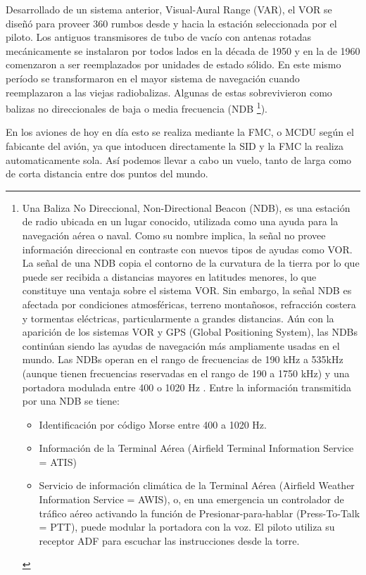 Desarrollado de un sistema anterior, Visual-Aural Range (VAR), el VOR se dise\~n\'o para proveer 360 rumbos desde y hacia la estaci\'on seleccionada por el piloto. Los antiguos transmisores de tubo de vac\'io con antenas rotadas mec\'anicamente se instalaron por todos lados en la d\'ecada de 1950 y en la de 1960 comenzaron a ser reemplazados por unidades de estado s\'olido. En este mismo per\'iodo se transformaron en el mayor sistema de navegaci\'on cuando reemplazaron a las viejas radiobalizas. Algunas de estas sobrevivieron como balizas no direccionales de baja o media frecuencia (NDB \footnote{Una Baliza No Direccional,  Non-Directional Beacon (NDB), es una estaci\'on de radio ubicada en un lugar conocido, utilizada como una ayuda para la navegaci\'on a\'erea o naval. Como su nombre implica, la se\~nal no provee informaci\'on direccional en contraste con nuevos tipos de ayudas como VOR. La se\~nal de una NDB copia el contorno de la curvatura de la tierra por lo que puede ser recibida a distancias mayores en latitudes menores, lo que constituye una ventaja sobre el sistema VOR. Sin embargo, la se\~nal NDB es afectada por condiciones atmosf\'ericas, terreno monta\~nosos, refracci\'on costera y tormentas el\'ectricas, particularmente a grandes distancias. A\'un con la aparici\'on de los sistemas VOR y GPS (Global Positioning System), las NDBs contin\'uan siendo las ayudas de navegaci\'on m\'as ampliamente usadas en el mundo. Las NDBs operan en el rango de frecuencias de 190 kHz a 535kHz (aunque tienen frecuencias reservadas en el rango de 190 a 1750 kHz) y una portadora modulada entre  400 o 1020 Hz \cite{NDB}. Entre la informaci\'on transmitida por una NDB se tiene:

\begin{itemize}
 \item Identificaci\'on por c\'odigo Morse entre 400 a 1020 Hz.
\item Informaci\'on de la Terminal A\'erea (Airfield Terminal Information Service = ATIS)
\item Servicio de informaci\'on clim\'atica de la Terminal A\'erea (Airfield Weather Information Service = AWIS), o, en una emergencia un controlador de tr\'afico a\'ereo activando la funci\'on de Presionar-para-hablar (Press-To-Talk = PTT), puede modular la portadora con la voz. El piloto utiliza su receptor ADF para escuchar las instrucciones desde la torre.
\end{itemize}
}).

En los aviones de hoy en d\'ia esto se realiza mediante la FMC, o MCDU seg\'un el fabicante del avi\'on, ya que intoducen directamente la SID y la FMC la realiza automaticamente sola. As\'i podemos llevar a cabo un vuelo, tanto de larga como de corta distancia entre dos puntos del mundo.

